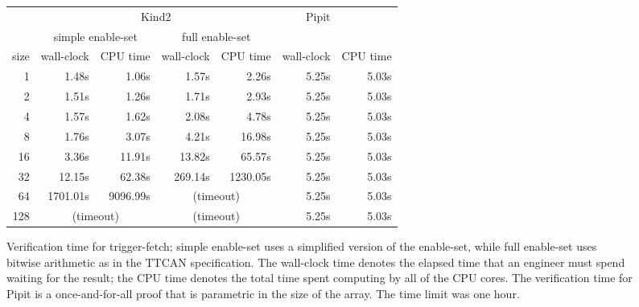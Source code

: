 \begin{figure}
  \center
\begin{tabular}{r|rr|rr|rr}
  & \multicolumn{4}{c|}{Kind2} & Pipit \\
  & \multicolumn{2}{c|}{simple enable-set} & \multicolumn{2}{c|}{full enable-set} & \\
  size & wall-clock & CPU time & wall-clock & CPU time & wall-clock & CPU time \\
  \hline
  
 1 & 1.48s&1.06s
 & 1.57s&2.26s
 & 5.25s&5.03s \\
 2 & 1.51s&1.26s
 & 1.71s&2.93s
 & 5.25s&5.03s \\
 4 & 1.57s&1.62s
 & 2.08s&4.78s
 & 5.25s&5.03s \\
 8 & 1.76s&3.07s
 & 4.21s&16.98s
 & 5.25s&5.03s \\
 16 & 3.36s&11.91s
 & 13.82s&65.57s
 & 5.25s&5.03s \\
 32 & 12.15s&62.38s
 & 269.14s&1230.05s
 & 5.25s&5.03s \\
 64 & 1701.01s&9096.99s
 &  \multicolumn{2}{c|}{(timeout)}  & 5.25s&5.03s \\
 128 &  \multicolumn{2}{c|}{(timeout)}  &  \multicolumn{2}{c|}{(timeout)}  & 5.25s&5.03s \\




\end{tabular}
\caption{Verification time for trigger-fetch; simple enable-set uses a simplified version of the enable-set, while full enable-set uses bitwise arithmetic as in the TTCAN specification.
The wall-clock time denotes the elapsed time that an engineer must spend waiting for the result; the CPU time denotes the total time spent computing by all of the CPU cores.
The verification time for Pipit is a once-and-for-all proof that is parametric in the size of the array.
The time limit was one hour.}
\label{f:evaluation:kind2-runtime}
\end{figure}

